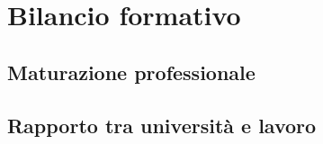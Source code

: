 
\section{Bilancio formativo}

\subsection{Maturazione professionale}



\subsection{Rapporto tra università e lavoro}



